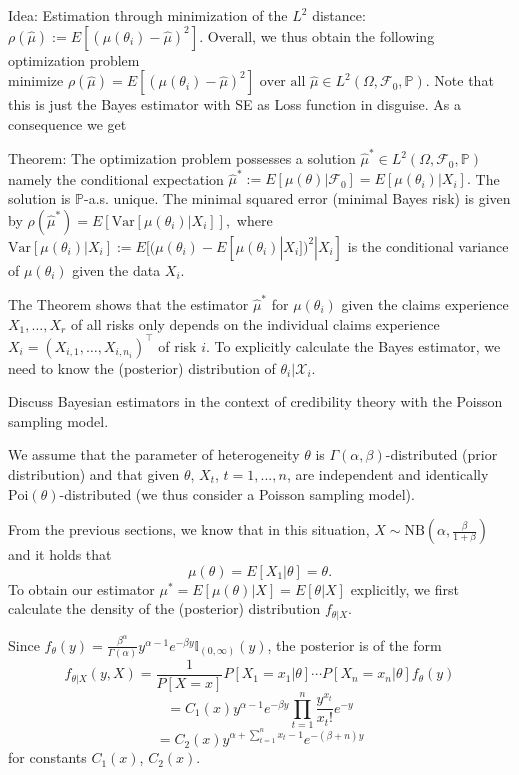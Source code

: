 Idea: Estimation through minimization of the \(L^2\) distance:
\(
\rho(\hat{\mu}) := E[(\mu(\theta_i) - \hat{\mu})^2].
\)
Overall, we thus obtain the following optimization problem
\(
\text{minimize } \rho(\hat{\mu}) = E[(\mu(\theta_i) - \hat{\mu})^2] \text{ over all } \hat{\mu} \in L^2 (\Omega, \mathcal{F}_0, \mathbb{P}).
\)
Note that this is just the Bayes estimator with SE as Loss function in disguise. As a consequence we get

Theorem:
The optimization problem possesses a solution \(\hat{\mu}^{\ast} \in L^2 (\Omega, \mathcal{F}_0, \mathbb{P})\) namely the conditional expectation
\(
\hat{\mu}^{\ast} := E[\mu(\theta) | \mathcal{F}_0] = E[\mu(\theta_i) | X_i].
\)
The solution is \(\mathbb{P}\)-a.s. unique. The minimal squared error (minimal Bayes risk) is given by
\(
\rho(\hat{\mu}^{\ast}) = E[\text{Var}[\mu(\theta_i) | X_i]],
\)
where \(\text{Var}[\mu(\theta_i) | X_i] := E[(\mu(\theta_i) - E[\mu(\theta_i) | X_i])^2 | X_i]\) is the conditional variance of \(\mu(\theta_i)\) given the data \(X_i\).

The Theorem shows that the estimator \(\hat{\mu}^{\ast}\) for \(\mu(\theta_i)\) given the claims experience \( X_1, \dots, X_r \) of all risks only
depends on the individual claims experience \( X_i = (X_{i,1}, \dots, X_{i, n_i})^\top \) of risk \( i \).
To explicitly calculate the Bayes estimator, we need to know the (posterior) distribution of \( \theta_i|\mathcal{X}_i \).

Discuss Bayesian estimators in the context of credibility theory with the Poisson sampling model.

We assume that the parameter of heterogeneity \(\theta\) is \(\Gamma(\alpha, \beta)\)-distributed (prior distribution) and that given \(\theta\), 
\(X_t\), \(t = 1, ..., n\), are independent and identically \(\text{Poi}(\theta)\)-distributed (we thus consider a Poisson sampling model).

From the previous sections, we know that in this situation, \(X \sim \text{NB}(\alpha, \frac{\beta}{1+\beta})\) and it holds that
\[
\mu(\theta) = E[X_1 | \theta] = \theta.
\]
To obtain our estimator \(\mu^{\ast} = E[\mu(\theta) | X] = E[\theta | X]\) explicitly, we first calculate the density of the (posterior) distribution 
\(f_{\theta | X}\).

Since \(f_{\theta}(y) = \frac{\beta^{\alpha}}{\Gamma(\alpha)} y^{\alpha-1} e^{-\beta y} \mathbb{I}_{(0, \infty)}(y)\), the posterior is of the form
\[
f_{\theta | X}(y, X) = \frac{1}{P[X=x]} P[X_1 = x_1 | \theta] \cdots P[X_n = x_n | \theta] f_{\theta}(y)
\]
\[
= C_1(x) y^{\alpha-1} e^{-\beta y} \prod_{t=1}^{n} \frac{y^{x_t}}{x_t!} e^{-y}
\]
\[
= C_2(x) y^{\alpha + \sum_{t=1}^{n} x_t - 1} e^{-(\beta + n)y}
\]
for constants \(C_1(x)\), \(C_2(x)\).

